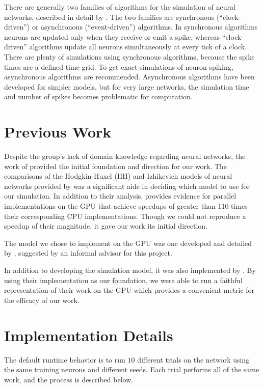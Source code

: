 \documentclass[a4paper]{article}
\begin{document}
There are generally two families of algorithms for the simulation of neural networks, described in detail by \cite{spike}. The two families are synchronous (“clock-driven”) or asynchronous (“event-driven”) algorithms. In synchronous algorithms neurons are updated only when they receive or emit a spike, whereas “clock-driven” algorithms update all neurons simultaneously at every tick of a clock. There are plenty of simulations using synchronous algorithms, because the spike times are a defined time grid. To get exact simulations of neuron spiking, asynchronous algorithms are recommended. Asynchronous algorithms have been developed for simpler models, but for very large networks, the simulation time and number of spikes becomes problematic for computation.


\section{Previous Work}
Despite the group's lack of domain knowledge regarding neural networks, the work of \cite{accel} provided the initial foundation and direction for our work. The comparisons of the Hodgkin-Huxel (HH) and Izhikevich models of neural networks provided by \cite{accel} was a significant aide in deciding which model to use for our simulation. In addition to their analysis, \cite{accel} provides evidence for parallel implementations on the GPU that achieve speedups of greater than 110 times their corresponding CPU implementations. Though we could not reproduce a speedup of their magnitude, it gave our work its initial direction.

The model we chose to implement on the GPU was one developed and detailed by \cite{synfire}, suggested by an informal advisor for this project.

In addition to developing the simulation model, it was also implemented by \cite{synfire}. By using their implementation as our foundation, we were able to run a faithful representation of their work on the GPU which provides a convenient metric for the efficacy of our work.


\section{Implementation Details}

The default runtime behavior is to run $10$ different trials on the network using the same training neurons and different seeds. Each trial performs all of the same work, and the process is described below.
\end{document}
